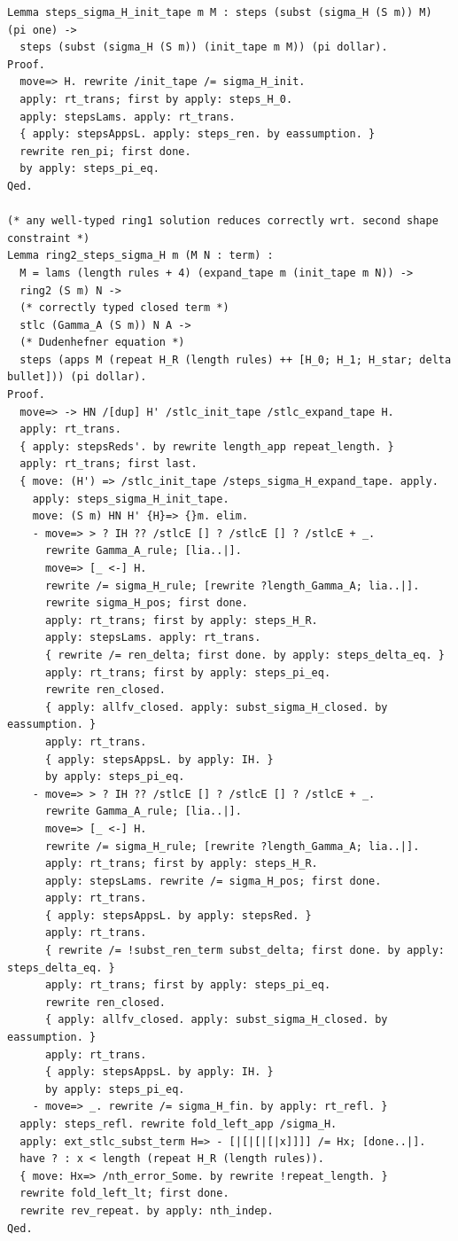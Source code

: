 \begin{lstlisting}
Lemma steps_sigma_H_init_tape m M : steps (subst (sigma_H (S m)) M) (pi one) ->
  steps (subst (sigma_H (S m)) (init_tape m M)) (pi dollar).
Proof.
  move=> H. rewrite /init_tape /= sigma_H_init.
  apply: rt_trans; first by apply: steps_H_0.
  apply: stepsLams. apply: rt_trans.
  { apply: stepsAppsL. apply: steps_ren. by eassumption. }
  rewrite ren_pi; first done.
  by apply: steps_pi_eq.
Qed.

(* any well-typed ring1 solution reduces correctly wrt. second shape constraint *)
Lemma ring2_steps_sigma_H m (M N : term) :
  M = lams (length rules + 4) (expand_tape m (init_tape m N)) ->
  ring2 (S m) N ->
  (* correctly typed closed term *)
  stlc (Gamma_A (S m)) N A ->
  (* Dudenhefner equation *)
  steps (apps M (repeat H_R (length rules) ++ [H_0; H_1; H_star; delta bullet])) (pi dollar).
Proof.
  move=> -> HN /[dup] H' /stlc_init_tape /stlc_expand_tape H.
  apply: rt_trans.
  { apply: stepsReds'. by rewrite length_app repeat_length. }
  apply: rt_trans; first last.
  { move: (H') => /stlc_init_tape /steps_sigma_H_expand_tape. apply.
    apply: steps_sigma_H_init_tape.
    move: (S m) HN H' {H}=> {}m. elim.
    - move=> > ? IH ?? /stlcE [] ? /stlcE [] ? /stlcE + _.
      rewrite Gamma_A_rule; [lia..|].
      move=> [_ <-] H.
      rewrite /= sigma_H_rule; [rewrite ?length_Gamma_A; lia..|].
      rewrite sigma_H_pos; first done.
      apply: rt_trans; first by apply: steps_H_R.
      apply: stepsLams. apply: rt_trans.
      { rewrite /= ren_delta; first done. by apply: steps_delta_eq. }
      apply: rt_trans; first by apply: steps_pi_eq.
      rewrite ren_closed.
      { apply: allfv_closed. apply: subst_sigma_H_closed. by eassumption. }
      apply: rt_trans.
      { apply: stepsAppsL. by apply: IH. }
      by apply: steps_pi_eq.
    - move=> > ? IH ?? /stlcE [] ? /stlcE [] ? /stlcE + _.
      rewrite Gamma_A_rule; [lia..|].
      move=> [_ <-] H.
      rewrite /= sigma_H_rule; [rewrite ?length_Gamma_A; lia..|].
      apply: rt_trans; first by apply: steps_H_R.
      apply: stepsLams. rewrite /= sigma_H_pos; first done.
      apply: rt_trans.
      { apply: stepsAppsL. by apply: stepsRed. }
      apply: rt_trans.
      { rewrite /= !subst_ren_term subst_delta; first done. by apply: steps_delta_eq. }
      apply: rt_trans; first by apply: steps_pi_eq.
      rewrite ren_closed.
      { apply: allfv_closed. apply: subst_sigma_H_closed. by eassumption. }
      apply: rt_trans.
      { apply: stepsAppsL. by apply: IH. }
      by apply: steps_pi_eq.
    - move=> _. rewrite /= sigma_H_fin. by apply: rt_refl. }
  apply: steps_refl. rewrite fold_left_app /sigma_H.
  apply: ext_stlc_subst_term H=> - [|[|[|[|x]]]] /= Hx; [done..|].
  have ? : x < length (repeat H_R (length rules)).
  { move: Hx=> /nth_error_Some. by rewrite !repeat_length. }
  rewrite fold_left_lt; first done.
  rewrite rev_repeat. by apply: nth_indep.
Qed.


\end{lstlisting}
